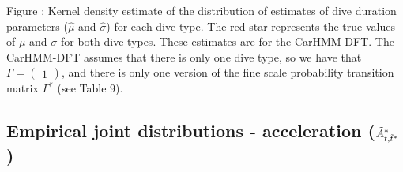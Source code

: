 \documentclass{article}
\begin{document}
        \noindent Figure : Kernel density estimate of the distribution of estimates of dive duration parameters ($\hat \mu$ and $\hat \sigma$) for each dive type. The red star represents the true values of $\mu$ and $\sigma$ for both dive types. These estimates are for the CarHMM-DFT. The CarHMM-DFT assumes that there is only one dive type, so we have that $\Gamma = \begin{pmatrix} 1 \end{pmatrix}$, and there is only one version of the fine scale probability transition matrix $\Gamma^*$ (see Table 9).
    
    \newpage
    \subsection{Empirical joint distributions - acceleration ($\tilde{A}^*_{t,\tilde t^*}$)}
\end{document}
